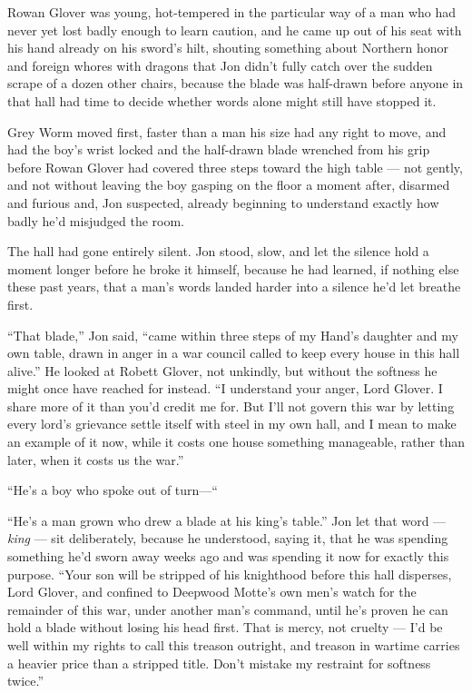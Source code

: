 Rowan Glover was young, hot-tempered in the particular way of a man who had never yet lost badly enough to learn caution, and he came up out of his seat with his hand already on his sword’s hilt, shouting something about Northern honor and foreign whores with dragons that Jon didn’t fully catch over the sudden scrape of a dozen other chairs, because the blade was half-drawn before anyone in that hall had time to decide whether words alone might still have stopped it.

Grey Worm moved first, faster than a man his size had any right to move, and had the boy’s wrist locked and the half-drawn blade wrenched from his grip before Rowan Glover had covered three steps toward the high table — not gently, and not without leaving the boy gasping on the floor a moment after, disarmed and furious and, Jon suspected, already beginning to understand exactly how badly he’d misjudged the room.

The hall had gone entirely silent. Jon stood, slow, and let the silence hold a moment longer before he broke it himself, because he had learned, if nothing else these past years, that a man’s words landed harder into a silence he’d let breathe first.

“That blade,” Jon said, “came within three steps of my Hand’s daughter and my own table, drawn in anger in a war council called to keep every house in this hall alive.” He looked at Robett Glover, not unkindly, but without the softness he might once have reached for instead. “I understand your anger, Lord Glover. I share more of it than you’d credit me for. But I’ll not govern this war by letting every lord’s grievance settle itself with steel in my own hall, and I mean to make an example of it now, while it costs one house something manageable, rather than later, when it costs us the war.”

“He’s a boy who spoke out of turn—“

“He’s a man grown who drew a blade at his king’s table.” Jon let that word — \textit{king} — sit deliberately, because he understood, saying it, that he was spending something he’d sworn away weeks ago and was spending it now for exactly this purpose. “Your son will be stripped of his knighthood before this hall disperses, Lord Glover, and confined to Deepwood Motte’s own men’s watch for the remainder of this war, under another man’s command, until he’s proven he can hold a blade without losing his head first. That is mercy, not cruelty — I’d be well within my rights to call this treason outright, and treason in wartime carries a heavier price than a stripped title. Don’t mistake my restraint for softness twice.”

